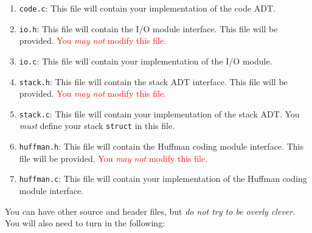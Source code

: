 \begin{enumerate}
  \item \texttt{code.c}: This file will contain your implementation of
    the code ADT.

  \item \texttt{io.h}: This file will contain the I/O module interface.
    This file will be provided. \textcolor{red}{You \emph{may not}
    modify this file.}

  \item \texttt{io.c}: This file will contain your implementation of the
    I/O module.

  \item \texttt{stack.h}: This file will contain the stack ADT
    interface. This file will be provided. \textcolor{red}{You \emph{may
    not} modify this file.}

  \item \texttt{stack.c}: This file will contain your implementation of
    the stack ADT. You \emph{must} define your stack \texttt{struct} in
    this file.

  \item \texttt{huffman.h}: This file will contain the Huffman coding
    module interface. This file will be provided. \textcolor{red}{You
    \emph{may not} modify this file.}

  \item \texttt{huffman.c}: This file will contain your implementation
    of the Huffman coding module interface.
\end{enumerate}


You can have other source and header files, but \emph{do not try to be
overly clever}. You will also need to turn in the following:

